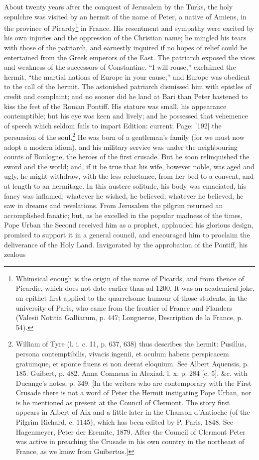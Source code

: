 About twenty years after the conquest of Jerusalem by the Turks, the holy sepulchre was visited by an hermit of the name of Peter, a native of Amiens, in the province of Picardy\footnote{Whimsical enough is the origin of the name of Picards, and from thence of Picardie, which does not date earlier than ad 1200. It was an academical joke, an epithet first applied to the quarrelsome humour of those students, in the university of Paris, who came from the frontier of France and Flanders (Valesii Notitia Galliarum, p. 447; Longuerue, Description de la France, p. 54).} in France. His resentment and sympathy were excited by his own injuries and the oppression of the Christian name; he mingled his tears with those of the patriarch, and earnestly inquired if no hopes of relief could be entertained from the Greek emperors of the East. The patriarch exposed the vices and weakness of the successors of Constantine. \texthebrew{“}I will rouse,\texthebrew{}” exclaimed the hermit, \texthebrew{“}the martial nations of Europe in your cause;\texthebrew{}” and Europe was obedient to the call of the hermit. The astonished patriarch dismissed him with epistles of credit and complaint; and no sooner did he land at Bari than Peter hastened to kiss the feet of the Roman Pontiff. His stature was small, his appearance contemptible; but his eye was keen and lively; and he possessed that vehemence of speech which seldom fails to impart Edition: current; Page: [192] the persuasion of the soul.\footnote{William of Tyre (l. i. c. 11, p. 637, 638) thus describes the hermit: Pusillus, persona contemptibilis, vivacis ingenii, et oculum habens perspicacem gratumque, et sponte fluens ei non deerat eloquium. See Albert Aquensis, p. 185. Guibert, p. 482. Anna Comnena in Alexiad. l. x. p. 284 [c. 5], \&c. with Ducange\texthebrew{}’s notes, p. 349. [In the writers who are contemporary with the First Crusade there is not a word of Peter the Hermit instigating Pope Urban, nor is he mentioned as present at the Council of Clermont. The story first appears in Albert of Aix and a little later in the Chanson d\texthebrew{}’Antioche (of the Pilgrim Richard, c. 1145), which has been edited by P. Paris, 1848. See Hagenmeyer, Peter der Eremite, 1879. After the Council of Clermont Peter was active in preaching the Crusade in his own country in the northeast of France, as we know from Guibertus.]} He was born of a gentleman\texthebrew{}’s family (for we must now adopt a modern idiom), and his military service was under the neighbouring counts of Boulogne, the heroes of the first crusade. But he soon relinquished the sword and the world; and, if it be true that his wife, however noble, was aged and ugly, he might withdraw, with the less reluctance, from her bed to a convent, and at length to an hermitage. In this austere solitude, his body was emaciated, his fancy was inflamed; whatever he wished, he believed; whatever he believed, he saw in dreams and revelations. From Jerusalem the pilgrim returned an accomplished fanatic; but, as he excelled in the popular madness of the times, Pope Urban the Second received him as a prophet, applauded his glorious design, promised to support it in a general council, and encouraged him to proclaim the deliverance of the Holy Land. Invigorated by the approbation of the Pontiff, his zealous 